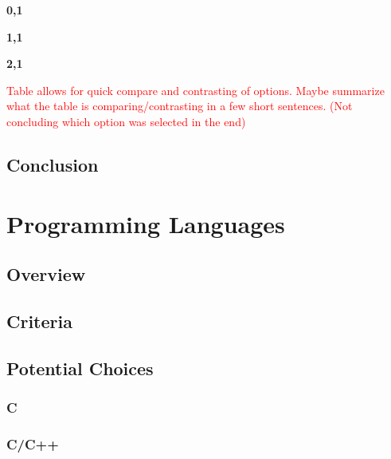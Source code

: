 \documentclass[letterpaper,10pt,onecolumn,compsoc]{IEEEtran}
\begin{document}
\noindent\leavevmode{}\hfill{\textbf{0,1}}\hfill{}\par

\noindent\leavevmode{}\hfill{\textbf{1,1}}\hfill{}\par

\noindent\leavevmode{}\hfill{\textbf{2,1}}\hfill{}\par

\textcolor{red}{Table allows for quick compare and contrasting of options.  Maybe summarize what the table is comparing/contrasting in a few short sentences. (Not concluding which option was selected in the end)}

\subsection{Conclusion}



\newpage

\iffalse
\fi

\section{Programming Languages}
\subsection{Overview}

\noindent



\subsection{Criteria}

\noindent


\subsection{Potential Choices}
\subsubsection{C}

\noindent


\subsubsection{C/C++}
\end{document}
